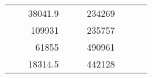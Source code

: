 \begin{table}[H]
\begin{tabular}{|ccrccrccc}
\multicolumn{1}{|c|}{\cellcolor[HTML]{FFFFC7}}                                & \multicolumn{1}{c|}{\cellcolor[HTML]{DAE8FC}}                      & \multicolumn{1}{r|}{\cellcolor[HTML]{DAE8FC}38041.9}   & \multicolumn{1}{c|}{\cellcolor[HTML]{FFFFC7}}                                & \multicolumn{1}{c|}{\cellcolor[HTML]{DAE8FC}}                       & \multicolumn{1}{r|}{\cellcolor[HTML]{DDFDFF}234269}    &                                                                              &                                                                    &                                                        \\ \cline{3-3} \cline{6-6}
\multicolumn{1}{|c|}{\cellcolor[HTML]{FFFFC7}}                                & \multicolumn{1}{c|}{\cellcolor[HTML]{DAE8FC}}                      & \multicolumn{1}{r|}{\cellcolor[HTML]{DDFDFF}109931}    & \multicolumn{1}{c|}{\cellcolor[HTML]{FFFFC7}}                                & \multicolumn{1}{c|}{\cellcolor[HTML]{DAE8FC}}                       & \multicolumn{1}{r|}{\cellcolor[HTML]{DAE8FC}235757}    &                                                                              &                                                                    &                                                        \\ \cline{3-3} \cline{6-6}
\multicolumn{1}{|c|}{\cellcolor[HTML]{FFFFC7}}                                & \multicolumn{1}{c|}{\cellcolor[HTML]{DAE8FC}}                      & \multicolumn{1}{r|}{\cellcolor[HTML]{DAE8FC}61855}     & \multicolumn{1}{c|}{\cellcolor[HTML]{FFFFC7}}                                & \multicolumn{1}{c|}{\cellcolor[HTML]{DAE8FC}}                       & \multicolumn{1}{r|}{\cellcolor[HTML]{DDFDFF}490961}    &                                                                              &                                                                    &                                                        \\ \cline{3-3} \cline{6-6}
\multicolumn{1}{|c|}{\cellcolor[HTML]{FFFFC7}}                                & \multicolumn{1}{c|}{\cellcolor[HTML]{DAE8FC}}                      & \multicolumn{1}{r|}{\cellcolor[HTML]{DDFDFF}18314.5}   & \multicolumn{1}{c|}{\cellcolor[HTML]{FFFFC7}}                                & \multicolumn{1}{c|}{\cellcolor[HTML]{DAE8FC}}                       & \multicolumn{1}{r|}{\cellcolor[HTML]{DAE8FC}442128}    &                                                                              &                                                                    &                                                        \\ \cline{3-3} \cline{6-6}

\end{tabular}
\end{table}

